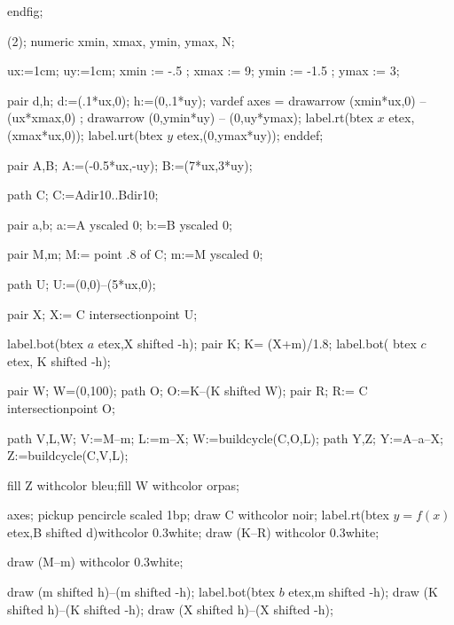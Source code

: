 \documentclass[12pt]{article}
\begin{document}
endfig;

\beginfig(2);
  numeric xmin, xmax, ymin, ymax, N;

  ux:=1cm;  uy:=1cm;
  xmin := -.5 ; xmax := 9;
  ymin := -1.5 ; ymax := 3;


  pair d,h;
  d:=(.1*ux,0);
  h:=(0,.1*uy);
  vardef axes =
   drawarrow (xmin*ux,0) -- (ux*xmax,0) ; %
   drawarrow (0,ymin*uy) -- (0,uy*ymax); %
   label.rt(btex $x$ etex,(xmax*ux,0)); %
   label.urt(btex $y$ etex,(0,ymax*uy)); %
  enddef;


pair A,B; A:=(-0.5*ux,-uy); B:=(7*ux,3*uy);

path C; C:=A{dir10}..B{dir10};

pair     a,b; a:=A yscaled 0; b:=B yscaled 0;


pair M,m; M:= point .8 of C; m:=M yscaled 0;

path U; U:=(0,0)--(5*ux,0);

pair X; X:= C intersectionpoint U;

label.bot(btex $a$ etex,X shifted -h);
pair K; K= (X+m)/1.8;  label.bot( btex $c$ etex, K shifted -h);

pair W; W=(0,100);
path O; O:=K--(K shifted W);
pair R; R:= C intersectionpoint O;


path V,L,W; V:=M--m; L:=m--X; W:=buildcycle(C,O,L);
path Y,Z; Y:=A--a--X; Z:=buildcycle(C,V,L);

fill Z withcolor bleu;fill W withcolor orpas; 

axes;
pickup  pencircle scaled 1bp;
draw C withcolor noir; label.rt(btex $y=f(x)$ etex,B shifted d)withcolor 0.3white;
draw (K--R)  withcolor 0.3white;



draw (M--m)  withcolor 0.3white;

 draw (m shifted h)--(m shifted -h); 
 label.bot(btex $b$ etex,m shifted -h);
 draw (K shifted h)--(K shifted -h); 
  draw (X shifted h)--(X shifted -h); 



\end{document}
